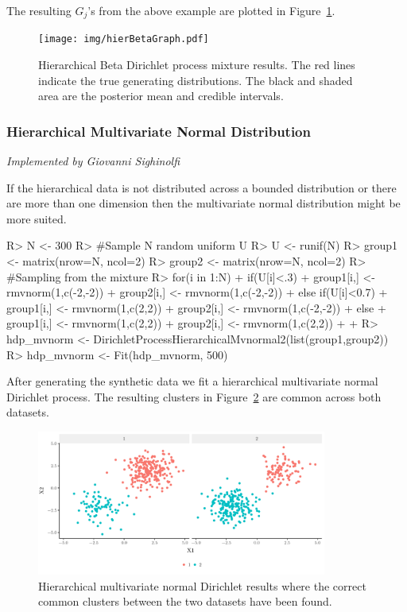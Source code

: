 \documentclass[nojss]{jss}
\begin{document}
The resulting $G_j$'s from the above example are plotted in Figure~\ref{fig:hierBeta}.
\begin{figure}
\centering
\texttt{[image: img/hierBetaGraph.pdf]}
\caption{Hierarchical Beta Dirichlet process mixture results. The red lines indicate the true generating distributions. The black and shaded area are the posterior mean and credible intervals.}
\label{fig:hierBeta}
\end{figure}

\subsubsection{Hierarchical Multivariate Normal Distribution}

\textit{Implemented by Giovanni Sighinolfi}

If the hierarchical data is not distributed across a bounded distribution or there are more than one dimension then the multivariate normal distribution might be more suited.

\begin{Schunk}
\begin{Sinput}
R> N <- 300
R> #Sample N random uniform U
R> U <- runif(N)
R> group1 <- matrix(nrow=N, ncol=2)
R> group2 <- matrix(nrow=N, ncol=2)
R> #Sampling from the mixture
R> for(i in 1:N){
+    if(U[i]<.3){
+      group1[i,] <- rmvnorm(1,c(-2,-2))
+      group2[i,] <- rmvnorm(1,c(-2,-2))
+    }else if(U[i]<0.7){
+      group1[i,] <- rmvnorm(1,c(2,2))
+      group2[i,] <- rmvnorm(1,c(-2,-2))
+    }else {
+      group1[i,] <- rmvnorm(1,c(2,2))
+      group2[i,] <- rmvnorm(1,c(2,2))
+    }
+  }
R> hdp_mvnorm <- DirichletProcessHierarchicalMvnormal2(list(group1,group2))
R> hdp_mvnorm <- Fit(hdp_mvnorm, 500)
\end{Sinput}
\end{Schunk}

After generating the synthetic data we fit a hierarchical multivariate normal Dirichlet process. The resulting clusters in Figure~\ref{fig:hierNormal} are common across both datasets.

\begin{figure}
\centering
\includegraphics[width=0.85\textwidth]{img/hierNormalGraph.pdf}
\caption{Hierarchical multivariate normal Dirichlet results where the correct common clusters between the two datasets have been found.}
\label{fig:hierNormal}
\end{figure}
\end{document}
